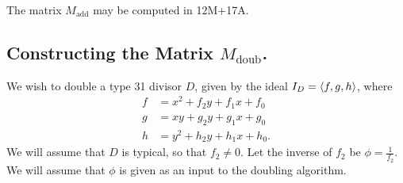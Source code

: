 \begin{lemma}
  The matrix $M_{\text{add}}$ may be computed in 12M+17A.
\end{lemma}



\subsection{Constructing the Matrix $M_{\text{doub}}$.}

We wish to double a type 31 divisor $D$, given by the ideal $I_D = \left\langle f,g,h \right\rangle$, where
\begin{align*}
  f &= x^2 + f_2y + f_1x + f_0 \\
  g &=  xy + g_2y + g_1x + g_0 \\
  h &= y^2 + h_2y + h_1x + h_0.
\end{align*}
We will assume that $D$ is typical, so that $f_2 \neq 0$.
Let the inverse of $f_2$ be $\phi = \frac 1 {f_2}$.
We will assume that $\phi$ is given as an input to the doubling algorithm.

